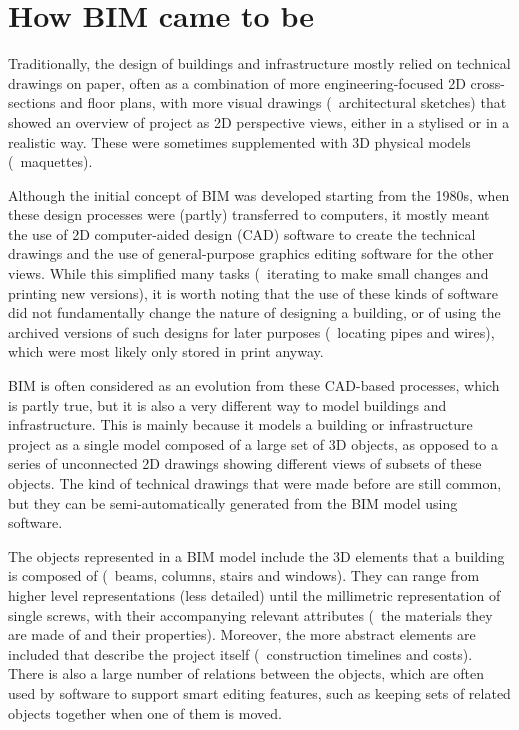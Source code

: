 \section{How BIM came to be}

Traditionally, the design of buildings and infrastructure mostly relied on technical drawings on paper, often as a combination of more engineering-focused 2D cross-sections and floor plans, with more visual drawings (\eg\ architectural sketches) that showed an overview of project as 2D perspective views, either in a stylised or in a realistic way.
These were sometimes supplemented with 3D physical models (\ie\ maquettes).

Although the initial concept of BIM was developed starting from the 1980s, when these design processes were (partly) transferred to computers, it mostly meant the use of 2D computer-aided design (CAD) software to create the technical drawings and the use of general-purpose graphics editing software for the other views.
While this simplified many tasks (\eg\ iterating to make small changes and printing new versions), it is worth noting that the use of these kinds of software did not fundamentally change the nature of designing a building, or of using the archived versions of such designs for later purposes (\eg\ locating pipes and wires), which were most likely only stored in print anyway.

BIM is often considered as an evolution from these CAD-based processes, which is partly true, but it is also a very different way to model buildings and infrastructure.
This is mainly because it models a building or infrastructure project as a single model composed of a large set of 3D objects, as opposed to a series of unconnected 2D drawings showing different views of subsets of these objects.
The kind of technical drawings that were made before are still common, but they can be semi-automatically generated from the BIM model using software.

The objects represented in a BIM model include the 3D elements that a building is composed of (\eg\ beams, columns, stairs and windows).
They can range from higher level representations (less detailed) until the millimetric representation of single screws, with their accompanying relevant attributes (\eg\ the materials they are made of and their properties).
Moreover, the more abstract elements are included that describe the project itself (\eg\ construction timelines and costs).
There is also a large number of relations between the objects, which are often used by software to support smart editing features, such as keeping sets of related objects together when one of them is moved.

